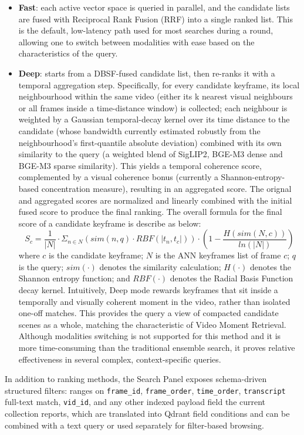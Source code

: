 \documentclass[11pt,a4paper]{article}
\begin{document}
\begin{itemize}[leftmargin=1.5em]
    \item \textbf{Fast}: each active vector space is queried in parallel, and the candidate lists are fused with Reciprocal Rank Fusion (RRF) into a single ranked list. This is the default, low-latency path used for most searches during a round, allowing one to switch between modalities with ease based on the characteristics of the query.
    \item \textbf{Deep}: starts from a DBSF-fused candidate list, then re-ranks it with a temporal aggregation step. Specifically, for every candidate keyframe, its local neighbourhood within the same video (either its k nearest visual neighbours or all frames inside a time-distance window) is collected; each neighbour is weighted by a Gaussian temporal-decay kernel over its time distance to the candidate (whose bandwidth currently estimated robustly from the neighbourhood's first-quantile absolute deviation) combined with its own similarity to the query (a weighted blend of SigLIP2, BGE-M3 dense and BGE-M3 sparse similarity). This yields a temporal coherence score, complemented by a visual coherence bonus (currently a Shannon-entropy-based concentration measure), resulting in an aggregated score. The orignal and aggregated scores are normalized and linearly combined with the initial fused score to produce the final ranking. The overall formula for the final score of a candidate keyframe is describe as below:
    $$S_c = \frac{1}{|N|} \cdot \Sigma_{n \in N} (sim(n, q) \cdot RBF(|t_n, t_c|)) \cdot (1 - \frac{H(sim(N, c))}{ln(|N|)})$$
    where $c$ is the candidate keyframe; $N$ is the ANN keyframes list of frame $c$; $q$ is the query; $sim(\cdot)$ denotes the similarity calculation; $H(\cdot)$ denotes the Shannon entropy function; and $RBF(\cdot)$ denotes the Radial Basis Function decay kernel. Intuitively, Deep mode rewards keyframes that sit inside a temporally and visually coherent moment in the video, rather than isolated one-off matches. This provides the query a view of compacted candidate scenes as a whole, matching the characteristic of Video Moment Retrieval. Although modalities switching is not supported for this method and it is more time-consuming than the traditional ensemble search, it proves relative effectiveness in several complex, context-specific queries.
\end{itemize}

In addition to ranking methods, the Search Panel exposes schema-driven structured filters: ranges on \texttt{frame\_id}, \texttt{frame\_order}, \texttt{time\_order}, \texttt{transcript} full-text match, \texttt{vid\_id}, and any other indexed payload field the current collection reports, which are translated into Qdrant field conditions and can be combined with a text query or used separately for filter-based browsing.
\end{document}
